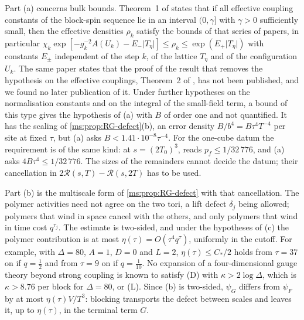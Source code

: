 \documentclass[11pt,a4paper]{amsart}
\theoremstyle{definition}
\theoremstyle{remark}
\numberwithin{equation}{section}
\newcommand{\abs}[1]{\lvert #1\rvert}      %
\newcommand{\cube}[1]{(2#1)^3}             %
\newcommand{\Mcirc}{\text{\upshape(M$^{\circ}$)}}   %
\begin{document}
Part (a) concerns bulk bounds. Theorem~1 of \cite{balaban1989b} states that if all effective coupling constants of the block-spin sequence lie in an interval $(0,\gamma]$ with $\gamma>0$ sufficiently small, then the effective densities $\rho_k$ satisfy the bounds of that series of papers, in particular $\chi_k\exp[-g_k^{-2}A(U_k)-E_-\abs{T_\eta}]\le\rho_k\le\exp(E_+\abs{T_\eta})$ with constants $E_\pm$ independent of the step $k$, of the lattice $T_\eta$ and of the configuration $U_k$. The same paper states that the proof of the result that removes the hypothesis on the effective couplings, Theorem~2 of \cite{balaban1987}, has not been published, and we found no later publication of it. Under further hypotheses on the normalisation constants and on the integral of the small-field term, a bound of this type gives the hypothesis of (a) with $B$ of order one and not quantified. It has the scaling of \cref{ms:prop:RG-defect}(b), an error density $B/b^4=B\tau^4T^{-4}$ per site at fixed $\tau$, but (a) asks $B<1.41\cdot10^{-8}\tau^{-4}$. For the one-cube datum the requirement is of the same kind: at $s=\cube{T_0}$, \Mcirc{} reads $p_f\le1/32\,776$, and (a) asks $4B\tau^4\le1/32\,776$. The sizes of the remainders cannot decide the datum; their cancellation in $2\mathcal R(s,T)-\mathcal R(s,2T)$ has to be used.

Part (b) is the multiscale form of \cref{ms:prop:RG-defect} with that cancellation. The polymer activities need not agree on the two tori, a lift defect $\delta_j$ being allowed; polymers that wind in space cancel with the others, and only polymers that wind in time cost $q^{\tau_j}$. The estimate is two-sided, and under the hypotheses of (c) the polymer contribution is at most $\eta(\tau)=O(\tau^4q^\tau)$, uniformly in the cutoff. For example, with $\Delta=80$, $A=1$, $D=0$ and $L=2$, $\eta(\tau)\le C_*/2$ holds from $\tau=37$ on if $q=\frac12$ and from $\tau=9$ on if $q=\frac1{10}$. No expansion of a four-dimensional gauge theory beyond strong coupling is known to satisfy (D) with $\kappa>2\log\Delta$, which is $\kappa>8.76$ per block for $\Delta=80$, or (L). Since (b) is two-sided, $\psi_G$ differs from $\psi_F$ by at most $\eta(\tau)V/T^3$: blocking transports the defect between scales and leaves it, up to $\eta(\tau)$, in the terminal term $G$.
\end{document}
